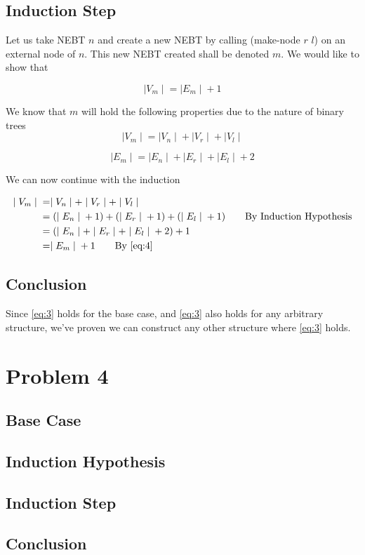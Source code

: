 \documentclass[paper=a4, fontsize=11pt]{scrartcl} %
\numberwithin{equation}{section} %
\numberwithin{figure}{section} %
\numberwithin{table}{section} %
\begin{document}
\subsection{Induction Step}
Let us take NEBT $n$ and create a new NEBT by calling (make-node $r$ $l$) on an external node of $n$. This new NEBT created shall be denoted $m$. We would like to show that 

\begin{equation}
\mid{V_m}\mid{} = \mid{E_m}\mid{} + 1
\end{equation}

We know that $m$ will hold the following properties due to the nature of binary trees
\begin{equation}
\mid{V_m}\mid{} = \mid{V_n}\mid{} + \mid{V_r}\mid{} + \mid{V_l}\mid{}
\end{equation}

\begin{equation}\label{eq:4}
\mid{E_m}\mid{} = \mid{E_n}\mid{} + \mid{E_r}\mid{} + \mid{E_l}\mid{}+2
\end{equation}

We can now continue with the induction

\begin{align} 
\mid{V_m}\mid{} &= \mid{V_n}\mid{} + \mid{V_r}\mid{} + \mid{V_l}\mid{}\\
				&= (\mid{E_n}\mid{} + 1) + (\mid{E_r}\mid{} + 1) + (\mid{E_l}\mid{} + 1)\tag*{By Induction Hypothesis}\\
				&= (\mid{E_n}\mid{} + \mid{E_r}\mid{} + \mid{E_l}\mid{} +2) +1 \tag*{}\\
				&= \mid{E_m}\mid{}+1 \tag*{By \ref{eq:4}} \\
\end{align}
\subsection{Conclusion}

Since \ref{eq:3} holds for the base case, and \ref{eq:3} also holds for any arbitrary structure, we've proven we can construct any other structure where \ref{eq:3} holds.

\section{Problem 4}
\subsection{Base Case}
\subsection{Induction Hypothesis}
\subsection{Induction Step}
\subsection{Conclusion}



\end{document}
